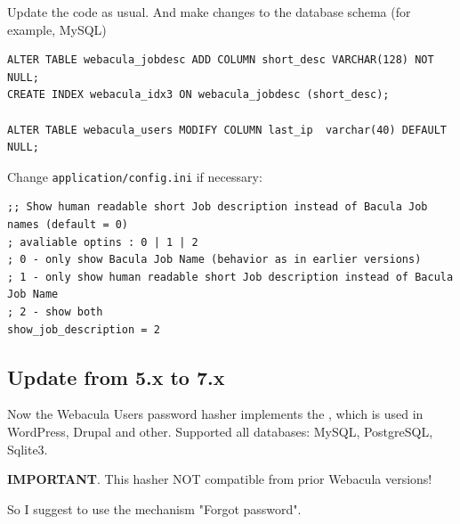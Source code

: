 \documentclass[10pt]{article}
\begin{document}
Update the code as usual.
And make changes to the database schema (for example, MySQL)

\begin{verbatim}
ALTER TABLE webacula_jobdesc ADD COLUMN short_desc VARCHAR(128) NOT NULL;
CREATE INDEX webacula_idx3 ON webacula_jobdesc (short_desc);

ALTER TABLE webacula_users MODIFY COLUMN last_ip  varchar(40) DEFAULT NULL;
\end{verbatim}

Change \texttt{application/config.ini} if necessary:

\begin{verbatim}
;; Show human readable short Job description instead of Bacula Job names (default = 0)
; avaliable optins : 0 | 1 | 2
; 0 - only show Bacula Job Name (behavior as in earlier versions)
; 1 - only show human readable short Job description instead of Bacula Job Name
; 2 - show both
show_job_description = 2
\end{verbatim}

\subsection{Update from 5.x to 7.x}
\label{Update: from 5.x to 7.x}

Now the Webacula Users password hasher implements the 
,
which is used in WordPress, Drupal and other.
Supported all databases: MySQL, PostgreSQL, Sqlite3.

\textbf{IMPORTANT}. This hasher NOT compatible from prior Webacula versions!

So I suggest to use the mechanism "Forgot password".
\end{document}
